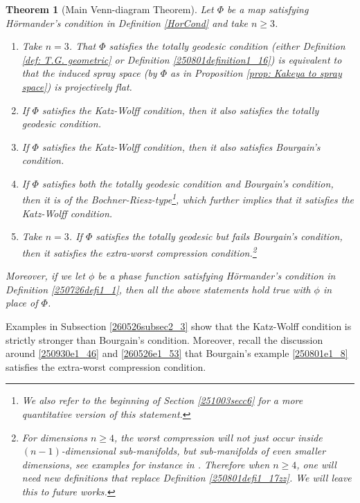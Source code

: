 \documentclass{article}
\numberwithin{equation}{section}
\theoremstyle{plain}
\newtheorem{theorem}{Theorem}[section]
\begin{document}
\begin{theorem}[Main Venn-diagram Theorem]\label{thm: main}
Let $\Phi$ be a map satisfying H\"ormander's condition in Definition \ref{HorCond} and take $n\geq 3$. 
    \begin{enumerate}
        \item\label{251003thm_item1} Take $n=3$. That $\Phi$ satisfies the totally geodesic condition (either Definition \ref{def: T.G. geometric} or Definition \ref{250801definition1_16}) is equivalent to that the induced  spray space (by $\Phi$ as in Proposition \ref{prop: Kakeya to spray space}) is projectively flat.\label{thm: main part 1}
        \item\label{251003thm_item2} If $\Phi$ satisfies the Katz-Wolff condition, then it also satisfies the totally geodesic condition.
        \label{thm: main part 2}
        \item\label{251003thm_item3} If $\Phi$ satisfies the Katz-Wolff condition, then it also satisfies Bourgain's condition. \label{thm: main part 3}
        \item\label{251003thm_item4} If $\Phi$ satisfies both the totally geodesic condition and Bourgain's condition, then it is of the Bochner-Riesz-type\footnote{We also refer to the beginning of Section \ref{251003secc6} for a more quantitative version of this statement.}, which further implies that it satisfies the Katz-Wolff condition.   \label{thm: main part 4}
        \item\label{251003thm_item5} Take $n=3$. If $\Phi$ satisfies the totally geodesic but fails Bourgain's condition, then it satisfies the extra-worst compression condition.\footnote{For dimensions $n\ge 4$, the worst compression will not just occur inside $(n-1)$-dimensional sub-manifolds, but sub-manifolds of even smaller dimensions, see examples for instance in \cite{GHI19}. Therefore when $n\ge 4$, one will need new definitions that replace Definition \ref{250801defi1_17zz}. We will leave this to future works.}  \label{thm: main part 5}
    \end{enumerate}
Moreover, if we let $\phi$ be a phase function satisfying H\"ormander's condition in Definition \ref{250726defi1_1}, then all the above statements hold true with $\phi$ in place of $\Phi$. 
\end{theorem}



Examples in Subsection \ref{260526subsec2_3} show that the Katz-Wolff condition is strictly stronger than Bourgain's condition. Moreover, recall the discussion around \eqref{250930e1_46} and \eqref{260526e1_53} that Bourgain's example \eqref{250801e1_8} satisfies the extra-worst compression condition. \\
\end{document}
